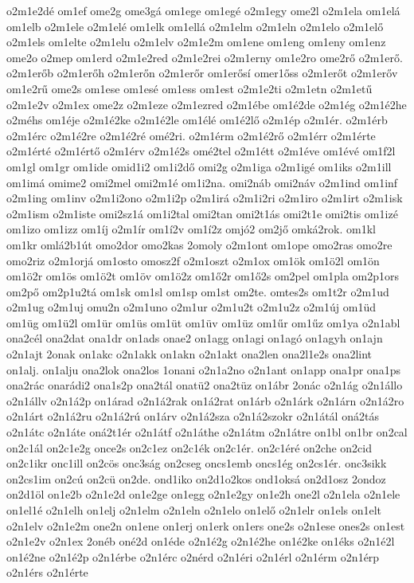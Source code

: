{o2m1e2dé
om1ef
ome2g
ome3gá
om1ege
om1egé
o2m1egy
ome2l
o2m1ela
om1elá
om1elb
o2m1ele
o2m1elé
om1elk
om1ellá
o2m1elm
o2m1eln
o2m1elo
o2m1elő
o2m1els
om1elte
o2m1elu
o2m1elv
o2m1e2m
om1ene
om1eng
om1eny
om1enz
ome2o
o2mep
om1erd
o2m1e2red
o2m1e2rei
o2m1erny
om1e2ro
ome2rő
o2m1erő.
o2m1erőb
o2m1erőh
o2m1erőn
o2m1erőr
om1erősí
omer1őss
o2m1erőt
o2m1erőv
om1e2rű
ome2s
om1ese
om1esé
om1ess
om1est
o2m1e2ti
o2m1etn
o2m1etű
o2m1e2v
o2m1ex
ome2z
o2m1eze
o2m1ezred
o2m1ébe
om1é2de
o2m1ég
o2m1é2he
o2méhs
om1éje
o2m1é2ke
o2m1é2le
om1élé
om1é2lő
o2m1ép
o2m1ér.
o2m1érb
o2m1érc
o2m1é2re
o2m1é2ré
omé2ri.
o2m1érm
o2m1é2rő
o2m1érr
o2m1érte
o2m1érté
o2m1értő
o2m1érv
o2m1é2s
omé2tel
o2m1étt
o2m1éve
om1évé
om1f2l
om1gl
om1gr
om1ide
omid1i2
om1i2dő
omi2g
o2m1iga
o2m1igé
om1iks
o2m1ill
om1imá
omime2
omi2mel
omi2m1é
om1i2na.
omi2náb
omi2náv
o2m1ind
om1inf
o2m1ing
om1inv
o2m1i2ono
o2m1i2p
o2m1irá
o2m1i2ri
o2m1iro
o2m1irt
o2m1isk
o2m1ism
o2m1iste
omi2sz1á
om1i2tal
omi2tan
omi2t1ás
omi2t1e
omi2tis
om1izé
om1izo
om1izz
om1íj
o2m1ír
om1í2v
om1í2z
omjó2
om2jő
omká2rok.
om1kl
om1kr
omlá2b1út
omo2dor
omo2kas
2omoly
o2m1ont
om1ope
omo2ras
omo2re
omo2riz
o2m1orjá
om1osto
omosz2f
o2m1oszt
o2m1ox
om1ök
om1ö2l
om1ön
om1ö2r
om1ös
om1ö2t
om1öv
om1ö2z
om1ő2r
om1ő2s
om2pel
om1pla
om2p1ors
om2pő
om2p1u2tá
om1sk
om1sl
om1sp
om1st
om2te.
omtes2s
om1t2r
o2m1ud
o2m1ug
o2m1uj
omu2n
o2m1uno
o2m1ur
o2m1u2t
o2m1u2z
o2m1új
om1üd
om1üg
om1ü2l
om1ür
om1üs
om1üt
om1üv
om1üz
om1űr
om1űz
om1ya
o2n1abl
ona2cél
ona2dat
ona1dr
on1ads
onae2
on1agg
on1agi
on1agó
on1agyh
on1ajn
o2n1ajt
2onak
on1akc
o2n1akk
on1akn
o2n1akt
ona2len
ona2l1e2s
ona2lint
on1alj.
on1alju
ona2lok
ona2los
1onani
o2n1a2no
o2n1ant
on1app
ona1pr
ona1ps
ona2rác
onarádi2
ona1s2p
ona2tál
onatü2
ona2tüz
on1ábr
2onác
o2n1ág
o2n1állo
o2n1állv
o2n1á2p
on1árad
o2n1á2rak
on1á2rat
on1árb
o2n1árk
o2n1árn
o2n1á2ro
o2n1árt
o2n1á2ru
o2n1á2rú
on1árv
o2n1á2sza
o2n1á2szokr
o2n1átál
oná2tás
o2n1átc
o2n1áte
oná2t1ér
o2n1átf
o2n1áthe
o2n1átm
o2n1átre
on1bl
on1br
on2cal
on2c1ál
on2c1e2g
once2s
on2c1ez
on2c1ék
on2c1ér.
on2c1éré
on2che
on2cid
on2c1ikr
onc1ill
on2cös
onc3ság
on2cseg
oncs1emb
oncs1ég
on2cs1ér.
onc3sikk
on2cs1im
on2cú
on2cü
on2de.
ond1iko
on2d1o2kos
ond1oksá
on2d1osz
2ondoz
on2d1öl
on1e2b
o2n1e2d
on1e2ge
on1egg
o2n1e2gy
on1e2h
one2l
o2n1ela
o2n1ele
on1el1é
o2n1elh
on1elj
o2n1elm
o2n1eln
o2n1elo
on1elő
o2n1elr
on1els
on1elt
o2n1elv
o2n1e2m
one2n
on1ene
on1erj
on1erk
on1ers
one2s
o2n1ese
ones2s
on1est
o2n1e2v
o2n1ex
2onéb
oné2d
on1éde
o2n1é2g
o2n1é2he
on1é2ke
on1éks
o2n1é2l
on1é2ne
o2n1é2p
o2n1érbe
o2n1érc
o2nérd
o2n1éri
o2n1érl
o2n1érm
o2n1érp
o2n1érs
o2n1érte
}
